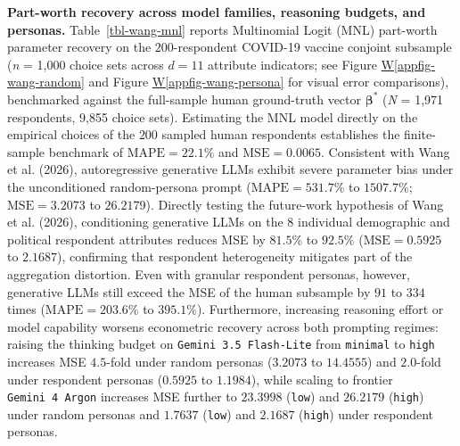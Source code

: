 \documentclass[
  letterpaper,
  DIV=11,
  numbers=noendperiod]{scrartcl}
\newcommand*\quartoappfigref[1]{Figure \hyperref[#1]{W\ref{#1}}}
\begin{document}
\textbf{Part-worth recovery across model families, reasoning budgets,
and personas.} Table~\ref{tbl-wang-mnl} reports Multinomial Logit (MNL)
part-worth parameter recovery on the \(200\)-respondent COVID-19 vaccine
conjoint subsample (\emph{n} = 1,000 choice sets across \(d = 11\)
attribute indicators; see \quartoappfigref{appfig-wang-random} and
\quartoappfigref{appfig-wang-persona} for visual error comparisons),
benchmarked against the full-sample human ground-truth vector
\(\boldsymbol{\beta}^*\) (\emph{N} = 1,971 respondents, 9,855 choice
sets). Estimating the MNL model directly on the empirical choices of the
\(200\) sampled human respondents establishes the finite-sample
benchmark of \(\mathrm{MAPE} = 22.1\%\) and \(\mathrm{MSE} = 0.0065\).
Consistent with Wang et al. (2026), autoregressive generative LLMs
exhibit severe parameter bias under the unconditioned random-persona
prompt (\(\mathrm{MAPE} = 531.7\%\) to \(1507.7\%\);
\(\mathrm{MSE} = 3.2073\) to \(26.2179\)). Directly testing the
future-work hypothesis of Wang et al. (2026), conditioning generative
LLMs on the \(8\) individual demographic and political respondent
attributes reduces MSE by \(81.5\%\) to \(92.5\%\)
(\(\mathrm{MSE} = 0.5925\) to \(2.1687\)), confirming that respondent
heterogeneity mitigates part of the aggregation distortion. Even with
granular respondent personas, however, generative LLMs still exceed the
MSE of the human subsample by \(91\) to \(334\) times
(\(\mathrm{MAPE} = 203.6\%\) to \(395.1\%\)). Furthermore, increasing
reasoning effort or model capability worsens econometric recovery across
both prompting regimes: raising the thinking budget on
\texttt{Gemini\ 3.5\ Flash-Lite} from \texttt{minimal} to \texttt{high}
increases MSE \(4.5\)-fold under random personas (\(3.2073\) to
\(14.4555\)) and \(2.0\)-fold under respondent personas (\(0.5925\) to
\(1.1984\)), while scaling to frontier \texttt{Gemini\ 4\ Argon}
increases MSE further to \(23.3998\) (\texttt{low}) and \(26.2179\)
(\texttt{high}) under random personas and \(1.7637\) (\texttt{low}) and
\(2.1687\) (\texttt{high}) under respondent personas.
\end{document}
